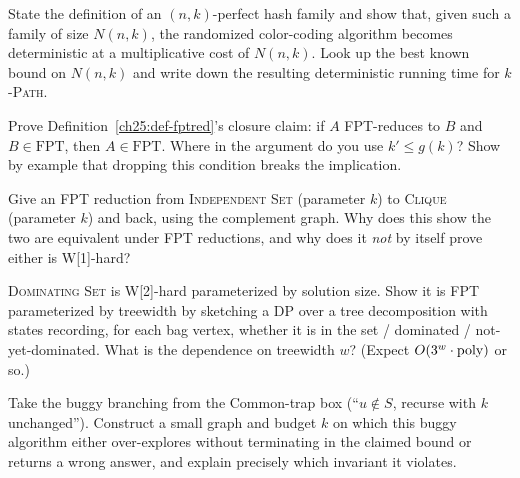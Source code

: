 \begin{exercise}
State the definition of an $(n,k)$-perfect hash family and show that, given such a family of size $N(n,k)$, the randomized color-coding algorithm becomes deterministic at a multiplicative cost of $N(n,k)$. Look up the best known bound on $N(n,k)$ and write down the resulting deterministic running time for \textsc{$k$-Path}.
\end{exercise}

\begin{exercise}
Prove Definition~\ref{ch25:def-fptred}'s closure claim: if $A$ FPT-reduces to $B$ and $B\in\mathrm{FPT}$, then $A\in\mathrm{FPT}$. Where in the argument do you use $k'\le g(k)$? Show by example that dropping this condition breaks the implication.
\end{exercise}

\begin{exercise}
Give an FPT reduction from \textsc{Independent Set} (parameter $k$) to \textsc{Clique} (parameter $k$) and back, using the complement graph. Why does this show the two are equivalent under FPT reductions, and why does it \emph{not} by itself prove either is W[1]-hard?
\end{exercise}

\begin{exercise}
\textsc{Dominating Set} is W[2]-hard parameterized by solution size. Show it is FPT parameterized by treewidth by sketching a DP over a tree decomposition with states recording, for each bag vertex, whether it is in the set / dominated / not-yet-dominated. What is the dependence on treewidth $w$? (Expect $O(3^w\cdot\operatorname{poly})$ or so.)
\end{exercise}

\begin{exercise}
Take the buggy branching from the Common-trap box (``$u\notin S$, recurse with $k$ unchanged''). Construct a small graph and budget $k$ on which this buggy algorithm either over-explores without terminating in the claimed bound or returns a wrong answer, and explain precisely which invariant it violates.
\end{exercise}
